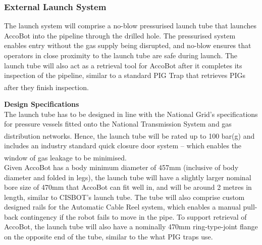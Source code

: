 \documentclass[11pt]{article}		%
\newcommand{\supercite}[1]{\textsuperscript{\cite{#1}}}		%
\begin{document}
		\subsubsection{External Launch System}
		    
            The launch system will comprise a no-blow pressurised launch tube that launches AccoBot into the pipeline through the drilled hole. The pressurised system enables entry without the gas supply being disrupted, and no-blow ensures that operators in close proximity to the launch tube are safe during launch. The launch tube will also act as a retrieval tool for AccoBot after it completes its inspection of the pipeline, similar to a standard PIG Trap that retrieves PIGs after they finish inspection\supercite{pigTrap}. 

            \textbf{Design Specifications}
            \\
            \hspace*{2ex}The launch tube has to be designed in line with the National Grid’s specifications for pressure vessels fitted onto the National Transmission System and gas distribution networks\supercite{NTSstandards}. Hence, the launch tube will be rated up to 100 bar(g) and includes an industry standard quick closure door system – which enables the window of gas leakage to be minimised\supercite{launchtubestandards}.
            \\
            \hspace*{2ex}Given AccoBot has a body minimum diameter of 457mm (inclusive of body diameter and folded in legs), the launch tube will have a slightly larger nominal bore size of 470mm that AccoBot can fit well in, and will be around 2 metres in length, similar to CISBOT’s launch tube. The tube will also comprise custom designed rails for the Automatic Cable Reel system, which enables a manual pull-back contingency if the robot fails to move in the pipe. To support retrieval of AccoBot, the launch tube will also have a nominally 470mm ring-type-joint flange on the opposite end of the tube, similar to the what PIG traps use. 
\end{document}
